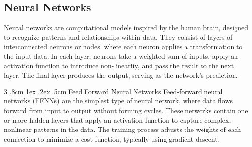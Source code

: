 \documentclass[%
reprint,s
amsmath,amssymb,
aps,
]{revtex4-2}
\makeatletter
\renewcommand{\subsubsection}{%
	\@startsection
	{subsubsection}%
	{3}%
	{\z@}%
	{.8cm \@plus1ex \@minus .2ex}%
	{.5cm}%
	{\normalfont\small\centering}%
}
\makeatother
\begin{document}
\subsection{Neural Networks}	\label{sec:neutral_networks}
Neural networks are computational models inspired by the human brain, designed to recognize patterns and relationships within data. They consist of layers of interconnected neurons or nodes, where each neuron applies a transformation to the input data. In each layer, neurons take a weighted sum of inputs, apply an activation function to introduce non-linearity, and pass the result to the next layer. The final layer produces the output, serving as the network’s prediction.

\subsubsection{Feed Forward Neural Networks}
Feed-forward neural networks (FFNNs) are the simplest type of neural network, where data flows forward from input to output without forming cycles. These networks contain one or more hidden layers that apply an activation function to capture complex, nonlinear patterns in the data. The training process adjusts the weights of each connection to minimize a cost function, typically using gradient descent.
\end{document}
